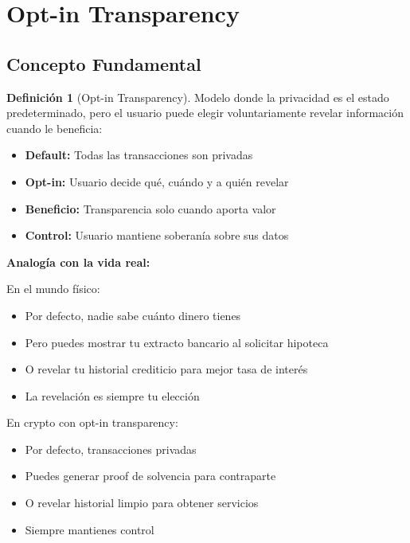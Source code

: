 \documentclass[11pt,a4paper,twoside]{book}
\theoremstyle{definition}
\newtheorem{definition}{Definición}[chapter]
\theoremstyle{remark}
\begin{document}
\section{Opt-in Transparency}
\label{sec:opt-in-transparency}

\subsection{Concepto Fundamental}

\begin{definition}[Opt-in Transparency]
Modelo donde la privacidad es el estado predeterminado, pero el usuario puede elegir voluntariamente revelar información cuando le beneficia:
\begin{itemize}
    \item \textbf{Default:} Todas las transacciones son privadas
    \item \textbf{Opt-in:} Usuario decide qué, cuándo y a quién revelar
    \item \textbf{Beneficio:} Transparencia solo cuando aporta valor
    \item \textbf{Control:} Usuario mantiene soberanía sobre sus datos
\end{itemize}
\end{definition}

\begin{intuicion}
\textbf{Analogía con la vida real:}

En el mundo físico:
\begin{itemize}
    \item Por defecto, nadie sabe cuánto dinero tienes
    \item Pero puedes mostrar tu extracto bancario al solicitar hipoteca
    \item O revelar tu historial crediticio para mejor tasa de interés
    \item La revelación es siempre tu elección
\end{itemize}

En crypto con opt-in transparency:
\begin{itemize}
    \item Por defecto, transacciones privadas
    \item Puedes generar proof de solvencia para contraparte
    \item O revelar historial limpio para obtener servicios
    \item Siempre mantienes control
\end{itemize}
\end{intuicion}
\end{document}
